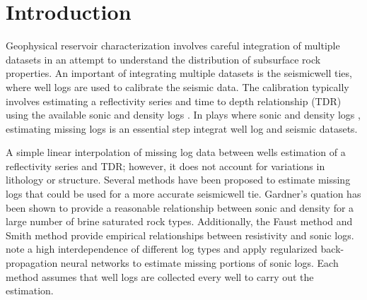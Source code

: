 \section{Introduction}
Geophysical reservoir characterization involves careful integration of multiple datasets in an attempt to understand the distribution of subsurface rock properties. An important  of integrating multiple datasets is the seismic\new{-}well ties, where well logs are used to calibrate the seismic data. The calibration typically involves estimating a reflectivity series and time to depth relationship (TDR) using the available sonic and density logs \cite[]{whitesimm2003}. In plays where  sonic and density logs , estimating missing logs is an essential step  integrat well log and seismic datasets.

A simple linear interpolation of missing log data between wells  estimation of a reflectivity series and TDR; however, it does not account for variations in lithology or structure. Several methods have been proposed to estimate missing logs that could be used for a more accurate seismic\new{-}well tie. Gardner's quation \cite[]{gardner1974formation} has been shown to provide a reasonable relationship between sonic and density for a large number of brine saturated rock types. Additionally, the Faust method \cite[]{faust1953velocity} and Smith method \cite[]{smith2007method} provide empirical relationships between resistivity and sonic logs. \cite{saggaf2003estimation} note a high interdependence of different log types and apply regularized back-propagation neural networks to estimate missing portions of sonic logs. Each method assumes that  well logs are collected  every well to carry out the estimation.

